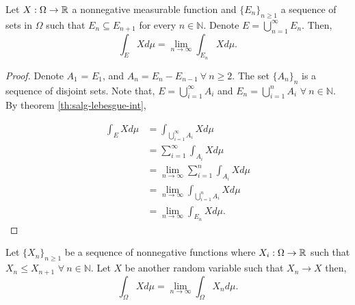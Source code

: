 \documentclass[../TGMAFFIRO.tex]{subfiles}
\begin{document}
\begin{corollary} \label{cor:partition_limit_integral}
	Let $X: \Omega \to \mathbb{R}$ a nonnegative measurable function and $\{E_n\}_{n\geq 1}$ a sequence of sets in $\Omega$ such that $E_n \subseteq E_{n+1}$ for every $n \in \mathbb{N}$. Denote $E = \bigcup_{n=1}^{\infty} E_n$. Then,
	\begin{equation}
		\int_E X d\mu = \lim_{n\to \infty} \int_{E_n} X d\mu.
	\end{equation}
\end{corollary}

\begin{proof}
	Denote $A_1$ = $E_1$, and $A_n = E_n - E_{n-1} \ \forall \ n \geq 2$. The set $\{A_n\}_n$ is a sequence of disjoint sets. Note that, $E = \bigcup_{i=1}^\infty A_i$ and $E_n = \bigcup_{i=1}^n A_i$ $\forall \ n \in \mathbb{N}$.\\
	
	By theorem \ref{th:salg-lebesgue-int},
	
	\begin{align*}
		\int_E X d\mu &= \int_{\bigcup_{i=1}^{\infty} A_i} X d\mu \\
		&= \sum_{i=1}^{\infty} \int_{A_i} X d\mu \\
		&= \lim_{n\to\infty} \sum_{i=1}^{n} \int_{A_i} X d\mu \\ 
		&= \lim_{n\to\infty} \int_{\bigcup_{i=1}^{n} A_i} X d\mu \\
		&= \lim_{n\to\infty} \int_{E_n} X d\mu.
	\end{align*}
\end{proof}


\begin{theorem}
Let $\{X_n\}_{n\geq 1}$ be a sequence of nonnegative functions where $X_i: \Omega \to \mathbb{R}$ such that $X_n \leq X_{n+1}$ $\forall \ n \in \mathbb{N}$. Let $X$ be another random variable such that $X_n \to X$ then,
\begin{equation}
	\int_\Omega X d\mu = \lim_{n\to \infty} \int_\Omega X_n d\mu.
\end{equation}
\end{theorem}
\end{document}
